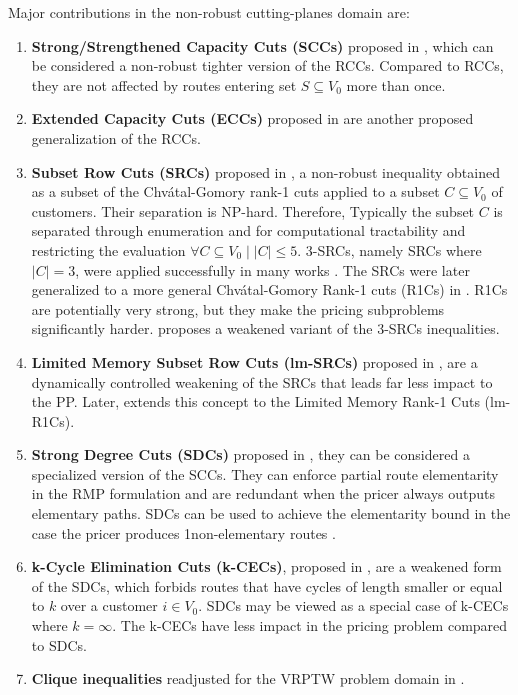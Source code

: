 \medskip

Major contributions in the non-robust cutting-planes domain are:

\begin{enumerate}
	\setlength{\itemsep}{0pt}
	\setlength{\parskip}{0pt}

	\item \textbf{Strong/Strengthened Capacity Cuts (SCCs)} proposed in \textcite{baldacci2008},
	      which can be considered a non-robust tighter version of the RCCs.
	      Compared to RCCs, they are not affected by routes entering set $S \subseteq V_0$ more than once.
	\item \textbf{Extended Capacity Cuts (ECCs)} proposed in \textcite{pessoa2008, pessoa2009}
	      are another proposed generalization of the RCCs.
	\item \textbf{Subset Row Cuts (SRCs)} proposed in \textcite{jepsen2008a}, a non-robust
	      inequality obtained as a subset of the  Chv\'atal-Gomory rank-1 cuts \parencite{chvatal1973}
	      applied to a subset $C \subseteq V_0$ of customers.
	      Their separation is NP-hard.
	      Therefore, Typically the subset $C$ is separated through enumeration
	      and for computational tractability and restricting the evaluation $\forall C \subseteq V_0 \mid |C| \le 5$.
	      3-SRCs, namely SRCs where $|C| = 3$, were applied successfully in many works \parencite{desaulniers2008, jepsen2008, baldacci2011, contardo2014, pecin2017improved}.
	      The SRCs were later generalized to a more general Chv\'atal-Gomory Rank-1 cuts (R1Cs) in \textcite{petersen2008}.
          R1Cs are potentially very strong, but they make the pricing subproblems significantly harder.
	      \textcite{baldacci2011} proposes a weakened variant of the 3-SRCs inequalities.
	\item \textbf{Limited Memory Subset Row Cuts (lm-SRCs)} proposed in \textcite{pecin2017improved},
	      are a dynamically controlled weakening of the SRCs that leads far less impact to
	      the PP.
	      Later, \textcite{pecin2017limited} extends this concept to the Limited Memory Rank-1 Cuts (lm-R1Cs).
	\item \textbf{Strong Degree Cuts (SDCs)} proposed in \textcite{contardo2011, contardo2014}, they can be considered
	      a specialized version of the SCCs.
	      They can enforce partial route elementarity in the RMP formulation
	      and are redundant when the pricer always outputs elementary paths.
	      SDCs can be used to achieve the elementarity bound in the case
	      the pricer produces 1non-elementary routes \parencite{contardo2014}.
	\item \textbf{k-Cycle Elimination Cuts (k-CECs)}, proposed in \textcite{contardo2014},
	      are a weakened form of the SDCs, which forbids
	      routes that have cycles of length smaller or equal to $k$ over a customer $i \in V_0$.
	      SDCs may be viewed as a special case of k-CECs where $k = \infty$.
	      The k-CECs have less impact in the pricing problem compared to SDCs.
    \item \textbf{Clique inequalities} readjusted for the VRPTW problem domain in \textcite{spoorendonk2010clique}.
\end{enumerate}


